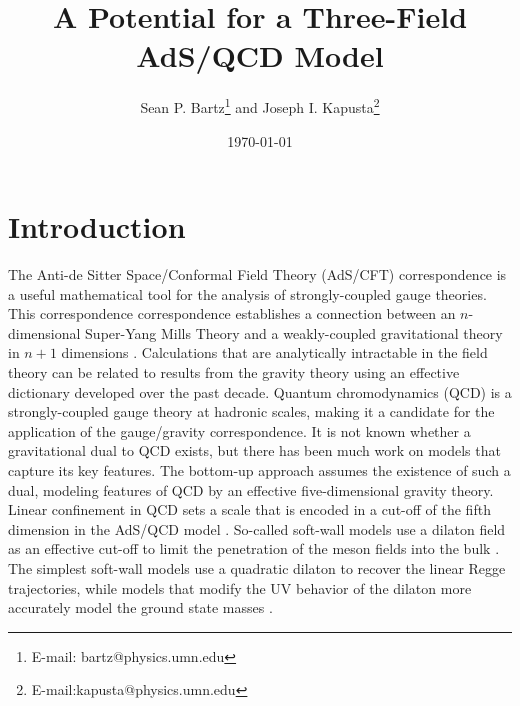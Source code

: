 \documentclass[12pt]{article}
\title{{\bf A Potential for a Three-Field AdS/QCD Model}}
\author{Sean P. Bartz\footnote{E-mail: bartz@physics.umn.edu} {\small and} Joseph I. Kapusta\footnote{E-mail:kapusta@physics.umn.edu}}
\date{\today}
\begin{document}
\maketitle

\vfill

\section{Introduction}

The Anti-de Sitter Space/Conformal Field Theory (AdS/CFT) correspondence is a useful mathematical tool for the analysis of strongly-coupled gauge theories.
This correspondence correspondence establishes a connection between an $n$-dimensional Super-Yang Mills Theory and a weakly-coupled gravitational theory in $n+1$ dimensions \cite{maldacena, Gubser1998, Witten:1998}. 
Calculations that are analytically intractable in the field theory can be related to results from the gravity theory using an effective dictionary developed over the past decade. 
Quantum chromodynamics (QCD) is a strongly-coupled gauge theory at hadronic scales, making it a candidate for the application of the gauge/gravity correspondence.
It is not known whether a gravitational dual to QCD exists, but there has been much work on models that capture its key features.
The bottom-up approach assumes the existence of such a dual, modeling features of QCD by an effective five-dimensional gravity theory.
Linear confinement in QCD sets a scale that is encoded in a cut-off of the fifth dimension in the AdS/QCD model \cite{stephanov-katz-son, DaRold2005}. 
So-called soft-wall models use a dilaton field as an effective cut-off to limit the penetration of the meson fields into the bulk \cite{karch-katz-son-adsqcd}. 
The simplest soft-wall models use a quadratic dilaton to recover the linear Regge trajectories, while models that modify the UV behavior of the dilaton more accurately model the ground state masses \cite{gherghetta-kelley, bartz-pions, Colangelo2008, Cui2013}.
\end{document}
